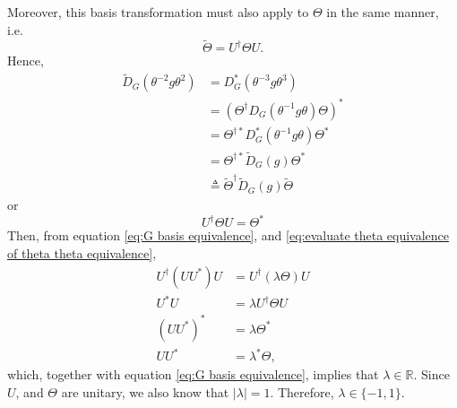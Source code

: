 \documentclass[preprint, 12pt]{revtex4-2}
\numberwithin{equation}{section}
\begin{document}
Moreover, this basis transformation must also apply to $\Theta$ in the same manner, i.e.
\begin{equation}\label{eq:theta equivalence of theta theta equivalence}
    \tilde{\Theta} = U^\dagger \Theta U.
\end{equation}
Hence,
\begin{equation}\label{eq:theta theta theta G basis equivalence}
    \begin{aligned}
        \tilde{D}_G(\theta^{-2}g\theta^2) &= D_G^\ast(\theta^{-3}g\theta^3) \\
        &= \left(\Theta^\dagger D_G(\theta^{-1}g\theta)\Theta\right)^\ast \\
        &= \Theta^{\dagger\ast} D_G^\ast(\theta^{-1}g\theta)\Theta^\ast \\
        &= \Theta^{\dagger\ast} \tilde{D}_G(g)\Theta^\ast \\
        &\triangleq \tilde{\Theta}^\dagger\tilde{D}_G(g)\tilde{\Theta}
    \end{aligned}
\end{equation}
or
\begin{equation}\label{eq:evaluate theta equivalence of theta theta equivalence}
    U^\dagger \Theta U = \Theta^\ast
\end{equation}
Then, from equation \ref{eq:G basis equivalence}, and \ref{eq:evaluate theta equivalence of theta theta equivalence},
\begin{equation}
    \begin{aligned}
        U^\dagger\left(UU^\ast\right)U &= U^\dagger\left(\lambda\Theta\right)U \\
        U^\ast U &= \lambda U^\dagger \Theta U \\
        \left(UU^\ast\right)^\ast &= \lambda \Theta^\ast \\
        UU^\ast &= \lambda^\ast\Theta,
    \end{aligned}
\end{equation}
which, together with equation \ref{eq:G basis equivalence}, implies that $\lambda\in\mathbb{R}$. Since $U$, and $\Theta$ are unitary, we also know that $|\lambda|=1$. Therefore, $\lambda\in\{-1,1\}$.
\end{document}
